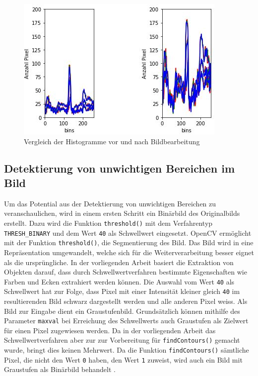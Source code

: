 \begin{figure}[H]
	\center
	\includegraphics[scale=0.9]{Grafiken/entwicklung/2HistrogrammVergleich.jpg}
	\caption{Vergleich der Histogramme vor und nach Bildbearbeitung} 
	\label{fig: Vergleich der Histogramme vor und nach Bildbearbeitung}
\end{figure}

\subsection{Detektierung von unwichtigen Bereichen im Bild}
Um das Potential aus der Detektierung von unwichtigen Bereichen zu veranschaulichen, wird in einem ersten Schritt ein Binärbild des Originalbilds erstellt. Dazu wird die Funktion \texttt{threshold()} mit dem Verfahrentyp \texttt{THRESH_BINARY} und dem Wert \texttt{40} als Schwellwert eingesetzt. OpenCV ermöglicht mit der Funktion \texttt{threshold()}, die Segmentierung des Bild. Das Bild wird in eine Repräsentation umgewandelt, welche sich für die Weiterverarbeitung besser eignet als die ursprüngliche. \cite[S.328-335]{FernandezVillan2019} In der vorliegenden Arbeit basiert die Extraktion von Objekten darauf, dass durch Schwellwertverfahren bestimmte Eigenschaften wie Farben und Ecken extrahiert werden können. Die Auswahl vom Wert \texttt{40} als Schwellwert hat zur Folge, dass Pixel mit einer Intensität kleiner gleich \texttt{40} im resultierenden Bild schwarz dargestellt werden und alle anderen Pixel weiss. Als Bild zur Eingabe dient ein Graustufenbild. Grundsätzlich können mithilfe des Parameter \texttt{maxval} bei Erreichung des Schwellwerts auch Graustufen als Zielwert für einen Pixel zugewiesen werden. Da in der vorliegenden Arbeit das Schwellwertverfahren aber zur zur Vorbereitung für \texttt{findContours()} gemacht wurde, bringt dies keinen Mehrwert. Da die Funktion \texttt{findContours()} sämtliche Pixel, die nicht den Wert \texttt{0} haben, den Wert \texttt{1} zuweist, wird auch ein Bild mit Graustufen als Binärbild behandelt \cite[S. 366]{FernandezVillan2019}. 

